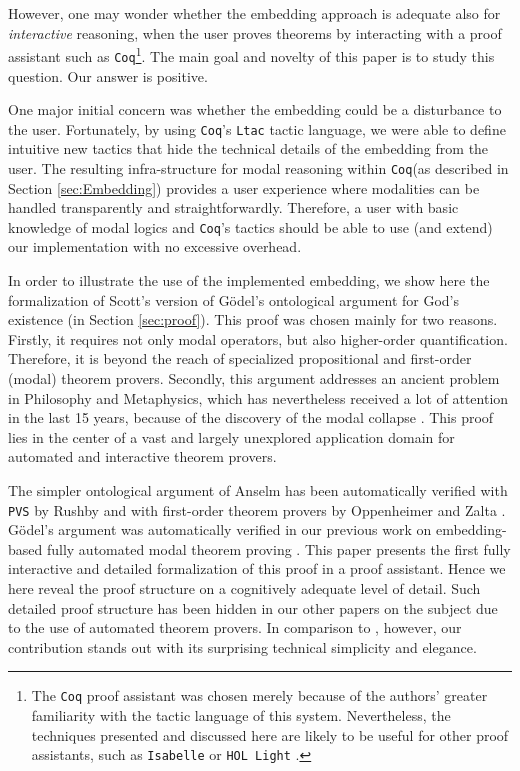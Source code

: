 \documentclass{llncs}
\newcommand{\Coq}{\texttt{Coq}\xspace}
\begin{document}
However, one may wonder whether the embedding approach is adequate
also for \emph{interactive} reasoning, when the user proves theorems
by interacting with a proof assistant such as \Coq\footnote{The \Coq
proof assistant was chosen merely because of the authors' greater
familiarity with the tactic language of this system. Nevertheless, the
techniques presented and discussed here are likely to be useful for
other proof assistants, such as \texttt{Isabelle} \cite{Isabelle} or
\texttt{HOL Light} \cite{HOLLight}.}. The main goal and novelty
of this paper is to study this question. Our answer is positive.

One major initial concern was whether the embedding could be a
disturbance to the user. Fortunately, by using \Coq's \texttt{Ltac}
tactic language, we were able to define intuitive new tactics that
hide the technical details of the embedding from the user. The
resulting infra-structure for modal reasoning within \Coq (as
described in Section \ref{sec:Embedding}) provides a user experience where
modalities can be handled transparently and straightforwardly.
Therefore, a user with basic knowledge of modal logics and \Coq's
tactics should be able to use (and extend) our implementation with no
excessive overhead.

In order to illustrate the use of the implemented embedding, we show
here the formalization of Scott's version \cite{ScottNotes} of G\"odel's
ontological argument for God's existence (in Section \ref{sec:proof}).
This proof was chosen mainly for two reasons. Firstly, it requires not
only modal operators, but also higher-order quantification. Therefore,
it is beyond the reach of specialized propositional and first-order
(modal) theorem provers. Secondly, this argument addresses an ancient
problem in Philosophy and Metaphysics, which has nevertheless received
a lot of attention in the last 15 years, because of the discovery of
the modal collapse \cite{sobel,sobel2004logic}. This proof lies in the center of a
vast and largely unexplored application domain for automated and
interactive theorem provers.

The simpler ontological argument of Anselm has been automatically
verified with \texttt{PVS} by Rushby \cite{Rushby} and with 
first-order theorem provers by Oppenheimer and Zalta \cite{Zalta}. G\"odel's
argument was automatically verified in our previous work on embedding-
based fully automated modal theorem proving \cite{arXiv,AFP}. This
paper presents the first fully interactive and detailed formalization
of this proof in a proof assistant. Hence we here reveal the proof
structure on a cognitively adequate level of
detail. Such detailed proof structure has been hidden in our
other papers on the subject due to the use of automated theorem
provers. In comparison to \cite{Rushby,Zalta}, however, our
contribution stands out with its surprising technical 
simplicity and elegance. 
\end{document}
